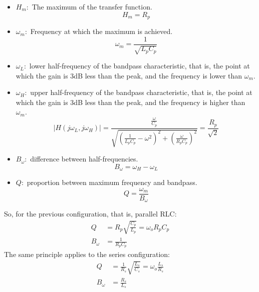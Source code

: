 \documentclass[nobib]{tufte-handout}
\newcommand{\defn}[2]{\noindent\textbf{#1}:\ #2}
\begin{document}
\begin{itemize}
    \item \defn{$H_m$}{The maximum of the transfer function.}
          \begin{equation*}
              H_m = R_p
          \end{equation*}
    \item \defn{$\omega_m$}{Frequency at which the maximum is achieved.}
          \begin{equation*}
              \omega_m = \frac{1}{\sqrt{L_pC_p}}
          \end{equation*}
    \item \defn{$\omega_L$}{lower half-frequency of the bandpass characteristic, that is, the point at which the gain is 3dB less than the peak, and the frequency is lower than $\omega_m$.}
    \item \defn{$\omega_H$}{upper half-frequency of the bandpass characteristic, that is, the point at which the gain is 3dB less than the peak, and the frequency is higher than $\omega_m$.}
          \begin{equation*}
              |H(j\omega_L,j\omega_H)| = \frac{\frac{\omega}{C_p}}{\sqrt{\left(\frac{1}{L_pC_p}-\omega^2\right)^2+\left(\frac{\omega}{R_pC_p}\right)^2}} = \frac{R_p}{\sqrt{2}}
          \end{equation*}
    \item \defn{$B_\omega$}{difference between half-frequencies}.
          \begin{equation*}
              B_\omega = \omega_H-\omega_L
          \end{equation*}
    \item \defn{$Q$}{proportion between maximum frequency and bandpass.}
          \begin{equation*}
              Q = \frac{\omega_m}{B_\omega}
          \end{equation*}
\end{itemize}
So, for the previous configuration, that is, parallel RLC:
\begin{align*}
    Q        & =R_p\sqrt{\frac{C_p}{L_p}} = \omega_oR_pC_p \\
    B_\omega & = \frac{1}{R_pC_p}
\end{align*}
The same principle applies to the series configuration:
\begin{align*}
    Q        & =\frac{1}{R_s}\sqrt{\frac{L_s}{C_s}} = \omega_o\frac{L_s}{R_s} \\
    B_\omega & = \frac{R_s}{L_s}
\end{align*}
\end{document}
